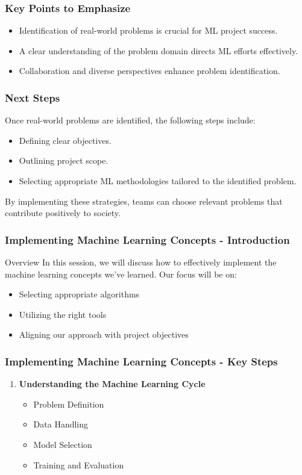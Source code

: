 \documentclass{beamer}
\begin{document}
\begin{frame}[fragile]
    \frametitle{Key Points to Emphasize}
    \begin{itemize}
        \item Identification of real-world problems is crucial for ML project success.
        \item A clear understanding of the problem domain directs ML efforts effectively.
        \item Collaboration and diverse perspectives enhance problem identification.
    \end{itemize}
\end{frame}

\begin{frame}[fragile]
    \frametitle{Next Steps}
    Once real-world problems are identified, the following steps include:
    \begin{itemize}
        \item Defining clear objectives.
        \item Outlining project scope.
        \item Selecting appropriate ML methodologies tailored to the identified problem.
    \end{itemize}
    By implementing these strategies, teams can choose relevant problems that contribute positively to society.
\end{frame}

\begin{frame}[fragile]
    \frametitle{Implementing Machine Learning Concepts - Introduction}
    \begin{block}{Overview}
        In this session, we will discuss how to effectively implement the machine learning concepts we've learned. Our focus will be on:
        \begin{itemize}
            \item Selecting appropriate algorithms
            \item Utilizing the right tools
            \item Aligning our approach with project objectives
        \end{itemize}
    \end{block}
\end{frame}

\begin{frame}[fragile]
    \frametitle{Implementing Machine Learning Concepts - Key Steps}
    \begin{enumerate}
        \item \textbf{Understanding the Machine Learning Cycle}
        \begin{itemize}
            \item Problem Definition
            \item Data Handling
            \item Model Selection
            \item Training and Evaluation
        \end{itemize}
    \end{enumerate}
\end{frame}
\end{document}
